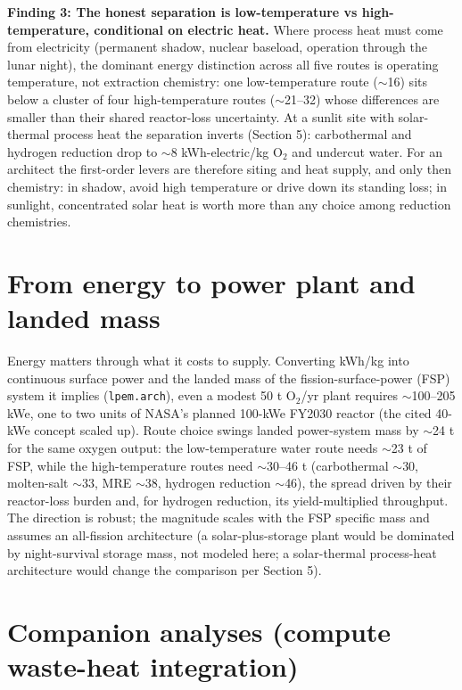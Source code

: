 \documentclass[11pt,a4paper]{article}
\begin{document}
\textbf{Finding 3: The honest separation is low-temperature vs high-temperature,
conditional on electric heat.} Where process heat must come from electricity (permanent
shadow, nuclear baseload, operation through the lunar night), the dominant energy
distinction across all five routes is operating temperature, not extraction chemistry: one
low-temperature route ($\sim$16) sits below a cluster of four high-temperature routes
($\sim$21--32) whose differences are smaller than their shared reactor-loss uncertainty.
At a sunlit site with solar-thermal process heat the separation inverts (Section 5):
carbothermal and hydrogen reduction drop to $\sim$8 kWh-electric/kg O$_2$ and undercut
water. For an architect the first-order levers are therefore siting and heat supply, and
only then chemistry: in shadow, avoid high temperature or drive down its standing loss; in
sunlight, concentrated solar heat is worth more than any choice among reduction
chemistries.

\section{From energy to power plant and landed mass}

Energy matters through what it costs to supply. Converting kWh/kg into continuous surface
power and the landed mass of the fission-surface-power (FSP) system it implies
(\texttt{lpem.arch}), even a modest 50 t O$_2$/yr plant requires $\sim$100--205 kWe, one
to two units of NASA's planned 100-kWe FY2030 reactor (the cited 40-kWe concept
\citep{oleson2022fsp} scaled up). Route choice swings landed power-system mass by
$\sim$24 t for the same oxygen output: the low-temperature water route needs $\sim$23 t of
FSP, while the high-temperature routes need $\sim$30--46 t (carbothermal $\sim$30,
molten-salt $\sim$33, MRE $\sim$38, hydrogen reduction $\sim$46), the spread driven by
their reactor-loss burden and, for hydrogen reduction, its yield-multiplied throughput.
The direction is robust; the magnitude scales with the FSP specific mass and assumes an
all-fission architecture (a solar-plus-storage plant would be dominated by night-survival
storage mass, not modeled here; a solar-thermal process-heat architecture would change the
comparison per Section 5).

\section{Companion analyses (compute waste-heat integration)}
\end{document}
